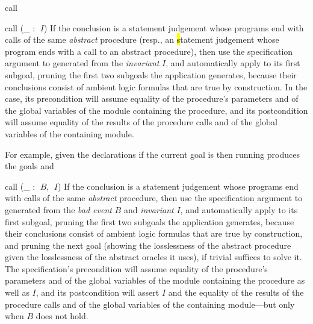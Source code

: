 \begin{tactic}{call}
  \begin{tsyntax}{call (_ : $\;I$)}
    If the conclusion is a \prhl statement judgement whose programs
    end with calls of the same \emph{abstract} procedure (resp., an
    \hl statement judgement whose program ends with a call to an
    abstract procedure), then use the specification argument to
     generated from the \emph{invariant} $I$, and
    automatically apply  to its first subgoal, pruning
    the first two subgoals the application generates, because their
    conclusions consist of ambient logic formulas that are true by
    construction.  In the \prhl case, its precondition will assume
    equality of the procedure's parameters and of the global variables
    of the module containing the procedure, and its postcondition will
    assume equality of the results of the procedure calls and of the
    global variables of the containing module.

    \medskip
    For example, given the declarations
    if the current goal is
    then running
    produces the goals
     and
  \end{tsyntax}

  \begin{tsyntax}{call (_ : $\;B$, $\;I$)}
    If the conclusion is a \prhl statement judgement whose programs
    end with calls of the same \emph{abstract} procedure, then use the
    specification argument to  generated from the \emph{bad
      event} $B$ and \emph{invariant} $I$, and automatically apply
     to its first subgoal, pruning the first two
    subgoals the application generates, because their conclusions
    consist of ambient logic formulas that are true by construction,
    and pruning the next goal (showing the losslessness of the abstract
    procedure given the losslessness of the abstract oracles it uses), if
    trivial suffices to solve it.
    The specification's precondition will assume equality of the
    procedure's parameters and of the global variables of the module
    containing the procedure as well as $I$, and its postcondition
    will assert $I$ and the equality of the results of the procedure
    calls and of the global variables of the containing module---but
    only when $B$ does not hold.


\end{tsyntax}
\end{tactic}
